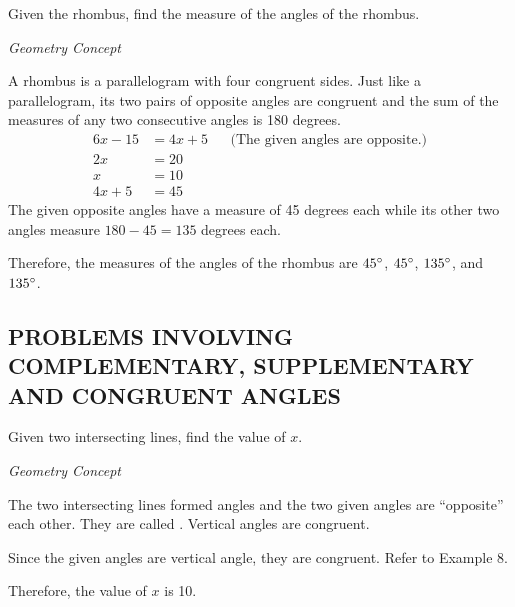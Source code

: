 \begin{example}
\Item Given the rhombus, find the measure of the angles of the rhombus.


\Solution

\textit{Geometry Concept}

A rhombus is a parallelogram with four congruent sides. Just like a parallelogram, its two pairs of
opposite angles are congruent and the sum of the measures of any two consecutive angles is 180
degrees.
%
\begin{align*}
6x - 15 &= 4x + 5 && \text{(The given angles are opposite.)}\\
2x &= 20\\
x &= 10\\
4x + 5 &= 45
\end{align*}
The given opposite angles have a measure of 45 degrees each while its other two angles
measure $180 - 45 = 135$ degrees each.

Therefore, the measures of the angles of the rhombus are $45\mathrm{^{\circ}}$, $45\mathrm{^{\circ}}$, $135\mathrm{^{\circ}}$, and $135\mathrm{^{\circ}}$.
\end{example}
\subsection*{PROBLEMS INVOLVING COMPLEMENTARY, SUPPLEMENTARY\\ AND CONGRUENT ANGLES}
\begin{example}
\item Given two intersecting lines, find the value of $x$.


\Solution

\textit{Geometry Concept}

The two intersecting lines formed angles and the two given angles are “opposite” each other. They are
called . Vertical angles are congruent. 

Since the given angles are vertical angle, they are congruent. Refer to Example 8.

Therefore, the value of $x$ is 10.
\end{example}

